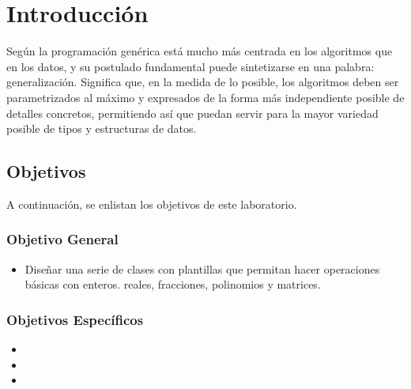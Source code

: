 \section{Introducción}

Según \cite{R1} la programación genérica está mucho más centrada en los algoritmos que en los datos, y su postulado fundamental puede sintetizarse en una palabra: generalización. Significa que, en la medida de lo posible, los algoritmos deben ser parametrizados al máximo y expresados de la forma más independiente posible de detalles concretos, permitiendo así que puedan servir para la mayor variedad posible de tipos y estructuras de datos.

\subsection{Objetivos}

A continuación, se enlistan los objetivos de este laboratorio.

\subsubsection{Objetivo General}
\begin{itemize}
\item Diseñar una serie de clases con plantillas que permitan hacer operaciones básicas con enteros. reales, fracciones, polinomios y matrices.
\end{itemize}

\subsubsection{Objetivos Específicos}
\begin{itemize}
\item 
\item 
\item 
\end{itemize}

